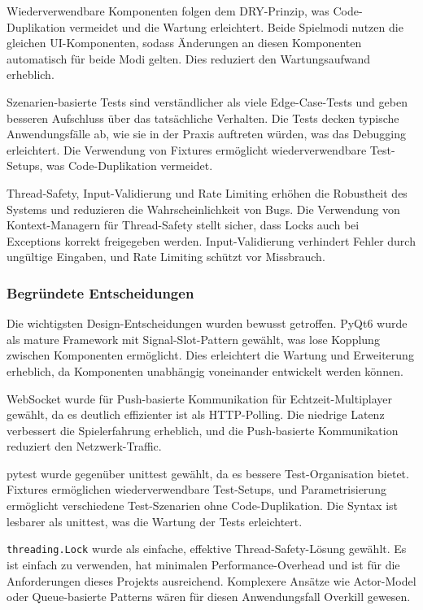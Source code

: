 Wiederverwendbare Komponenten folgen dem DRY-Prinzip, was Code-Duplikation vermeidet und die Wartung erleichtert.
Beide Spielmodi nutzen die gleichen UI-Komponenten, sodass Änderungen an diesen Komponenten automatisch für beide Modi gelten.
Dies reduziert den Wartungsaufwand erheblich.

Szenarien-basierte Tests sind verständlicher als viele Edge-Case-Tests und geben besseren Aufschluss über das tatsächliche Verhalten.
Die Tests decken typische Anwendungsfälle ab, wie sie in der Praxis auftreten würden, was das Debugging erleichtert.
Die Verwendung von Fixtures ermöglicht wiederverwendbare Test-Setups, was Code-Duplikation vermeidet.

Thread-Safety, Input-Validierung und Rate Limiting erhöhen die Robustheit des Systems und reduzieren die Wahrscheinlichkeit von Bugs.
Die Verwendung von Kontext-Managern für Thread-Safety stellt sicher, dass Locks auch bei Exceptions korrekt freigegeben werden.
Input-Validierung verhindert Fehler durch ungültige Eingaben, und Rate Limiting schützt vor Missbrauch.

\subsubsection{Begründete Entscheidungen}

Die wichtigsten Design-Entscheidungen wurden bewusst getroffen.
PyQt6 wurde als mature Framework mit Signal-Slot-Pattern gewählt, was lose Kopplung zwischen Komponenten ermöglicht.
Dies erleichtert die Wartung und Erweiterung erheblich, da Komponenten unabhängig voneinander entwickelt werden können.

WebSocket wurde für Push-basierte Kommunikation für Echtzeit-Multiplayer gewählt, da es deutlich effizienter ist als HTTP-Polling.
Die niedrige Latenz verbessert die Spielerfahrung erheblich, und die Push-basierte Kommunikation reduziert den Netzwerk-Traffic.

pytest wurde gegenüber unittest gewählt, da es bessere Test-Organisation bietet.
Fixtures ermöglichen wiederverwendbare Test-Setups, und Parametrisierung ermöglicht verschiedene Test-Szenarien ohne Code-Duplikation.
Die Syntax ist lesbarer als unittest, was die Wartung der Tests erleichtert.

\texttt{threading.Lock} wurde als einfache, effektive Thread-Safety-Lösung gewählt.
Es ist einfach zu verwenden, hat minimalen Performance-Overhead und ist für die Anforderungen dieses Projekts ausreichend.
Komplexere Ansätze wie Actor-Model oder Queue-basierte Patterns wären für diesen Anwendungsfall Overkill gewesen.

